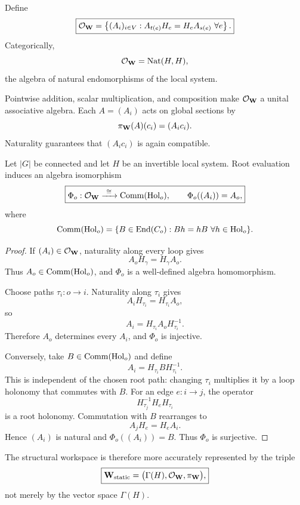 
\begin{definition}\label{def:workspace-operator-algebra}
Define
\[
\boxed{
\mathcal O_{\mathbf W}
=
\left\{
(A_i)_{i\in V}:
A_{t(e)}H_e=H_eA_{s(e)}\ \forall e
\right\}.
}
\]
Categorically,
\[
\mathcal O_{\mathbf W}=\operatorname{Nat}(H,H),
\]
the algebra of natural endomorphisms of the local system.
\end{definition}

Pointwise addition, scalar multiplication, and composition make
\(\mathcal O_{\mathbf W}\) a unital associative algebra. Each
\(A=(A_i)\) acts on global sections by
\[
\pi_{\mathbf W}(A)(c_i)=(A_ic_i).
\]
Naturality guarantees that \((A_ic_i)\) is again compatible.

\begin{theorem}\label{thm:commutant-characterization}
Let \(|G|\) be connected and let \(H\) be an invertible local system. Root
evaluation induces an algebra isomorphism
\[
\boxed{
\Phi_o:\mathcal O_{\mathbf W}
\xrightarrow{\ \cong\ }
\operatorname{Comm}(\operatorname{Hol}_o),
\qquad
\Phi_o((A_i))=A_o,
}
\]
where
\[
\operatorname{Comm}(\operatorname{Hol}_o)
=
\{B\in\operatorname{End}(C_o):Bh=hB\ \forall h\in\operatorname{Hol}_o\}.
\]
\end{theorem}

\begin{proof}
If \((A_i)\in\mathcal O_{\mathbf W}\), naturality along every loop gives
\[
A_oH_\gamma=H_\gamma A_o.
\]
Thus \(A_o\in\operatorname{Comm}(\operatorname{Hol}_o)\), and \(\Phi_o\) is a well-defined
algebra homomorphism.

Choose paths \(\tau_i:o\to i\). Naturality along \(\tau_i\) gives
\[
A_iH_{\tau_i}=H_{\tau_i}A_o,
\]
so
\[
A_i=H_{\tau_i}A_oH_{\tau_i}^{-1}.
\]
Therefore \(A_o\) determines every \(A_i\), and \(\Phi_o\) is injective.

Conversely, take \(B\in\operatorname{Comm}(\operatorname{Hol}_o)\) and define
\[
A_i=H_{\tau_i}BH_{\tau_i}^{-1}.
\]
This is independent of the chosen root path: changing \(\tau_i\) multiplies
it by a loop holonomy that commutes with \(B\). For an edge \(e:i\to j\), the
operator
\[
H_{\tau_j}^{-1}H_eH_{\tau_i}
\]
is a root holonomy. Commutation with \(B\) rearranges to
\[
A_jH_e=H_eA_i.
\]
Hence \((A_i)\) is natural and \(\Phi_o((A_i))=B\). Thus \(\Phi_o\) is
surjective.
\end{proof}

The structural workspace is therefore more accurately represented by the
triple
\[
\boxed{
\mathbf W_{\mathrm{static}}
=
\bigl(
\Gamma(H),
\mathcal O_{\mathbf W},
\pi_{\mathbf W}
\bigr),
}
\]
not merely by the vector space \(\Gamma(H)\).

